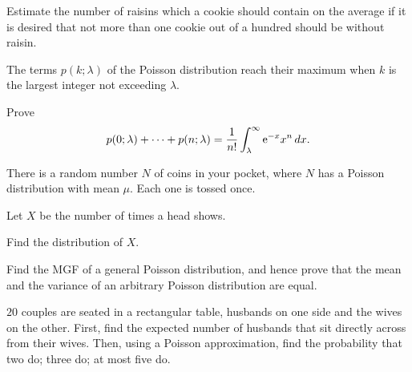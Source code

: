 \begin{problem}[Handout 10, \# 9]
  Estimate the number of raisins which a cookie should contain on the
  average if it is desired that not more than one cookie out of a hundred
  should be without raisin.
\end{problem}
\begin{solution*}

\end{solution*}

\begin{problem}[Handout 10, \# 10]
  The terms \(p(k;\lambda)\) of the Poisson distribution reach their
  maximum when \(k\) is the largest integer not exceeding \(\lambda\).
\end{problem}
\begin{solution*}

\end{solution*}

\begin{problem}[Handout 10, \# 11]
  Prove
  \[
    p(0;\lambda)+\dotsb+p(n;\lambda) =\frac{1}{n!}\int_\lambda^\infty
    \mathrm{e}^{-x}x^n\mathop{}\!d x.
  \]
\end{problem}
\begin{solution*}

\end{solution*}

\begin{problem}[Handout 10, \# 12]
  There is a random number \(N\) of coins in your pocket, where \(N\) has a
  Poisson distribution with mean \(\mu\). Each one is tossed once.

  \noindent Let \(X\) be the number of times a head shows.

  \noindent Find the distribution of \(X\).
\end{problem}
\begin{solution*}

\end{solution*}

\begin{problem}[Handout 10, \# 14]
  Find the MGF of a general Poisson distribution, and hence prove that the
  mean and the variance of an arbitrary Poisson distribution are equal.
\end{problem}
\begin{solution*}

\end{solution*}

\begin{problem}
  \(20\) couples are seated in a rectangular table, husbands on one side
  and the wives on the other. First, find the expected number of husbands
  that sit directly across from their wives. Then, using a Poisson
  approximation, find the probability that two do; three do; at most five
  do.
\end{problem}
\begin{solution*}

\end{solution*}

